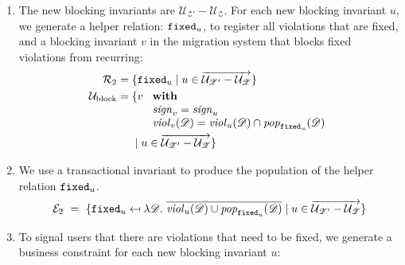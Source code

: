 \documentclass[runningheads]{llncs}
\newcommand{\id}[1]{\text{\it #1\/}}
\newcommand{\popF}[1]{\id{pop}_{#1}}
\newcommand{\pop}[2]{\popF{#1}(#2)}
\newcommand{\viol}[2]{\violC{#1}(#2)}
\newcommand{\violC}[1]{\id{viol}_{#1}}
\newcommand{\sign}[1]{\id{sign}_{#1}}
\newcommand{\rels}{\mathcal{R}}   %
\newcommand{\rules}{\mathcal{U}}
\newcommand{\transactions}{\mathcal{E}}
\newcommand{\dataset}{\mathscr{D}}
\newcommand{\schema}{\mathscr{Z}}
\newcommand{\migrsys}{\mathscr{M}}
\newcommand{\cmpl}[1]{\overline{#1}}
\begin{document}
\begin{enumerate}
\item\label{step3}
   The new blocking invariants are $\rules_{\schema'}-\rules_{\schema}$.
   For each new blocking invariant $u$, we generate a helper relation: ${\tt fixed}_u$, to register all violations that are fixed,
   and a blocking invariant $v$ in the migration system that blocks fixed violations from recurring:
   \begin{align}
      \rels_2={}&\{{\tt fixed}_u\mid u \in\overrightarrow{\rules_{\schema'}-\rules_{\schema}}\}\\
      \rules_\text{block}={}&\{v\ 
      \begin{array}[t]{l}
         \text{\bf with}\\
         \sign{v}=\sign{u}\\
         \viol{v}{\dataset}=\viol{u}{\dataset}\cap\pop{{\tt fixed}_u}{\dataset}
      \end{array}\label{eqn:blockRule}\\
      &\mid u\in\overrightarrow{\rules_{\schema'}-\rules_{\schema}}\}\notag
   \end{align}
\item\label{step4}
   We use a transactional invariant to produce the population of the helper relation ${\tt fixed}_u$.
   \begin{equation}
     \transactions_2\ =\ \{{\tt fixed}_u\mapsfrom\lambda\dataset.~\cmpl{\viol{u}{\dataset} \cup \pop{{\tt fixed}_u}{\dataset}}\mid u\in\overrightarrow{\rules_{\schema'}-\rules_{\schema}}\}\label{eqn:enforceForRules}
   \end{equation}
\item\label{step5} To signal users that there are violations that need to be fixed, we generate a business constraint for each new blocking invariant $u$:

\end{enumerate}
\end{document}
